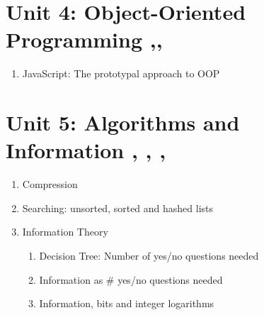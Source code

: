 \documentclass{report}
\begin{document}
\section{Unit 4: Object-Oriented Programming ,, }
\begin{enumerate}
\item JavaScript: The prototypal approach to OOP
\end{enumerate}
\section{Unit 5: Algorithms and Information , , , }
\begin{enumerate}
\item Compression
\item Searching: unsorted, sorted and hashed lists
\item Information Theory
	\begin{enumerate}
	\item Decision Tree: Number of yes/no questions needed
	\item Information as \# yes/no questions needed
	\item Information, bits and integer logarithms
	\end{enumerate}
\end{enumerate}
\end{document}
